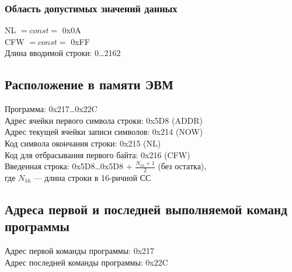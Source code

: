 \subsubsection{Область допустимых значений данных}
\noindent NL $=const=$ 0x0A\\
CFW $=const=$ 0xFF\\
Длина вводимой строки: 0\ldots2162

\subsection{Расположение в памяти ЭВМ}
\noindent Программа: 0x217\ldots0x22C\\
Адрес ячейки первого символа строки: 0x5D8 (ADDR)\\
Адрес текущей ячейки записи символов: 0x214 (NOW)\\
Код символа окончания строки: 0x215 (NL)\\
Код для отбрасывания первого байта: 0x216 (CFW)\\
Введенная строка: 0x5D8\ldots0x5D8 $+$ $\frac{N_{16}+1}{2}$ (без остатка),\\где $N_{16}$ --- длина строки в 16-ричной СС

\subsection{Адреса первой и последней выполняемой команд программы}
\noindent Адрес первой команды программы: 0x217\\
Адрес последней команды программы: 0x22C

